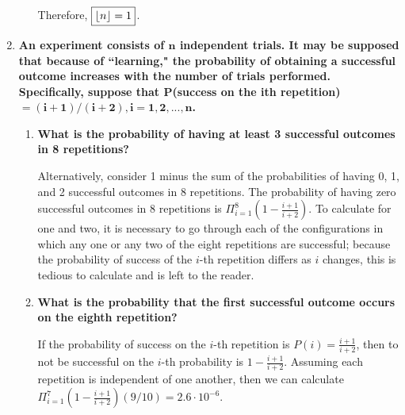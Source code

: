 \documentclass[10pt, oneside]{article}   	%
\theoremstyle{definition}
\DeclarePairedDelimiter\floor{\lfloor}{\rfloor}
\begin{document}
\begin{enumerate}[label=4.\arabic*]
\begin{enumerate}
	Therefore, $\boxed{\floor{n} = 1}$.
	
	\end{enumerate}

\item  \begin{tcolorbox}[
  colback=Cerulean!5!white,
  colframe=Cerulean!75!black]
\textbf{An experiment consists of $\bm{n}$ independent trials. It may be supposed that because of ``learning," the probability of obtaining a successful outcome increases with the number of trials performed. Specifically, suppose that $\bm{P}$(success on the ith repetition) $\bm{= (i+1)/(i+2), i = 1,2,...,n}$.}
\end{tcolorbox}

	\begin{enumerate}
	\item  \begin{tcolorbox}[
	  colback=Cerulean!5!white,
	  colframe=Cerulean!75!black]
	\textbf{What is the probability of having at least 3 successful outcomes in 8 repetitions?}
	\end{tcolorbox}
	
	Alternatively, consider 1 minus the sum of the probabilities of having 0, 1, and 2 successful outcomes in 8 repetitions. The probability of having zero successful outcomes in 8 repetitions is $\Pi_{i=1}^8 (1 - \frac{i+1}{i+2})$. To calculate for one and two, it is necessary to go through each of the configurations in which any one or any two of the eight repetitions are successful; because the probability of success of the $i$-th repetition differs as $i$ changes, this is tedious to calculate and is left to the reader.
	
	\item  \begin{tcolorbox}[
	  colback=Cerulean!5!white,
	  colframe=Cerulean!75!black]
	\textbf{What is the probability that the first successful outcome occurs on the eighth repetition?}
	\end{tcolorbox}
	
	If the probability of success on the $i$-th repetition is $P(i) = \frac{i+1}{i+2}$, then to not be successful on the $i$-th probability is $1 - \frac{i+1}{i+2}$. Assuming each repetition is independent of one another, then we can calculate $\Pi_{i=1}^7 (1 - \frac{i+1}{i+2}) (9/10) = \boxed{2.6 \cdot 10^{-6}}$.
	
	\end{enumerate}


\end{enumerate}
\end{document}
